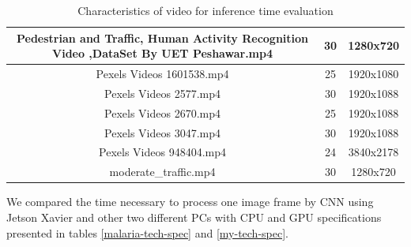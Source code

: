 \documentclass[twoside]{ctuthesis}
\theoremstyle{plain}
\theoremstyle{definition}
\theoremstyle{note}
\begin{document}
\begin{table}[H]
{\begin{tabular}{|c|c|c|}
Pedestrian and Traffic, Human Activity Recognition Video ,DataSet By UET Peshawar.mp4 & 30                                                                            & 1280x720                                                            \\ \hline
Pexels Videos 1601538.mp4                                                             & 25                                                                            & 1920x1080                                                           \\ \hline
Pexels Videos 2577.mp4                                                                & 30                                                                            & 1920x1088                                                           \\ \hline
Pexels Videos 2670.mp4                                                                & 25                                                                            & 1920x1088                                                           \\ \hline
Pexels Videos 3047.mp4                                                                & 30                                                                            & 1920x1088                                                           \\ \hline
Pexels Videos 948404.mp4                                                              & 24                                                                            & 3840x2178                                                           \\ \hline
moderate\_traffic.mp4                                                                 & 30                                                                            & 1280x720                                                            \\ \hline
\end{tabular}
}
\caption{Characteristics of video for inference time evaluation}
\label{video_characteristics}
\end{table}

        
We compared the time necessary to process one image frame by CNN using Jetson Xavier and other two different PCs with CPU and GPU specifications presented in tables \ref{malaria-tech-spec} and \ref{my-tech-spec}.  
\end{document}
